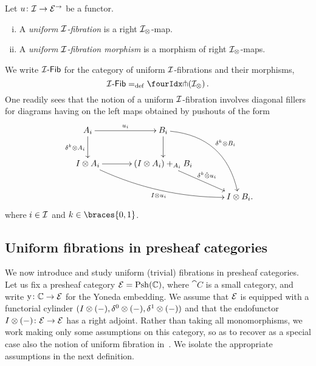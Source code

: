 \documentclass[reqno,10pt,a4paper,oneside,draft]{amsart}
\begin{document}
\begin{definition} \label{def:I-fibration}
Let $u \co \cal{I} \to \catE^\to$ be a functor.
\begin{enumerate}[(i)]
\item A \emph{uniform $\cal{I}$-fibration} is a right $\cal{I}_\otimes$-map.
\item A \emph{uniform $\cal{I}$-fibration morphism} is a morphism of right $\cal{I}_\otimes$-maps.
\end{enumerate}
\end{definition}

We write $\Fib{\cal{I}}$ for the category of uniform $\cal{I}$-fibrations and their morphisms, \ie
\[
  \Fib{\cal{I}} \defeq \liftr{(\cal{I}_\otimes)} \, .
\]
One readily sees that the notion of a uniform $\cal{I}$-fibration involves diagonal fillers for diagrams having on the left maps obtained by pushouts of the form
\begin{gather*}
\xymatrix@C=1.2cm{
  A_i
  \ar[r]^{u_i}
  \ar[d]_{\kcyl \otimes A_i}
&
  B_i
  \ar@/^2pc/[ddr]^{\kcyl \otimes B_i}
  \ar[d]
&\\
  \interval \otimes A_i
  \ar@/_1pc/[drr]_{\interval \otimes u_i}
  \ar[r]
&
  (\interval \otimes A_i) +_{A_i} B_i
  \ar[dr]^-{\delta^k \hatotimes u_i}
&\\&&
  \interval \otimes B_i
\rlap{.}}
\end{gather*}
where $i \in \cal{I}$ and $k \in \braces{0, 1}$.

\subsection*{Uniform fibrations in presheaf categories}

We now introduce and study uniform (trivial) fibrations in presheaf categories.
Let us fix a presheaf category $\catE = \Psh(\cat{C})$, where $\cat{C}$ is a small category, and write $\yon \co \catC \to \catE$ for the Yoneda embedding.
We assume that $\catE$ is equipped with a functorial cylinder $( \interval \otimes (-), \lcyl \otimes (-), \rcyl \otimes (-))$ and that the endofunctor $ \interval\otimes (-) \co \catE \to \catE$ has a right adjoint.%
Rather than taking all monomorphisms, we work making only some assumptions on this category, so as to recover as a special case also the notion of uniform fibration in~\cite{cohen-et-al:cubicaltt}.
We isolate the appropriate assumptions in the next definition.
\end{document}
